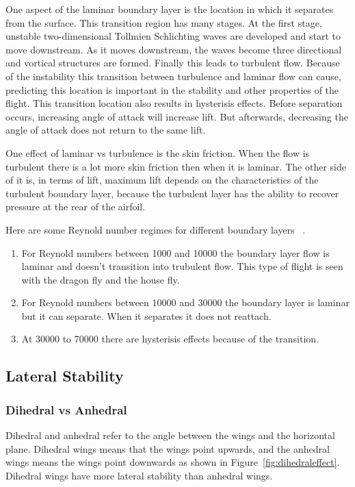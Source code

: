 One aspect of the laminar boundary layer is the location in which it separates from the surface.
This transition region has many stages. At the first stage, unstable two-dimensional Tollmien Schlichting
waves are developed and start to move downstream. As it moves downstream, the waves become three directional
and vortical structures are formed. Finally this leads to turbulent flow.
Because of the instability this transition between turbulence and laminar flow 
can cause, predicting this location is important in the stability and other properties of the flight. 
This transition location also results in hysterisis effects. Before separation
occurs, increasing angle of attack will increase lift. But afterwards,
decreasing the angle of attack does not return to the same lift. 

One effect of laminar vs turbulence is the skin friction. When the flow is turbulent there
is a lot more skin friction then when it is laminar. The other side of it is, 
in terms of lift, maximum
lift depends on the characteristics of the turbulent boundary layer, because the
turbulent layer has the ability to recover pressure at the
rear of the airfoil.

Here are some Reynold number regimes for different boundary layers ~\cite{mueller}.

\begin{enumerate}
\item For Reynold numbers between 1000 and 10000 the boundary layer flow is laminar
and doesn't transition into trubulent flow. This type of flight is seen with
the dragon fly and the house fly. 
\item  For Reynold numbers between 10000 and 30000 the boundary layer is laminar but
it can separate. When it separates it does not reattach.
\item At 30000 to 70000 there are hysterisis effects because of the transition. 

\end{enumerate}

\subsection{Lateral Stability}

\subsubsection{Dihedral vs Anhedral}
\label{sec:dihedral}

Dihedral and anhedral refer to the angle between the wings and the horizontal plane.
Dihedral wings means that the wings point upwards, and the anhedral wings means the wings point
downwards as shown in Figure~\ref{fig:dihedraleffect}. Dihedral wings have more lateral 
stability than anhedral wings.

